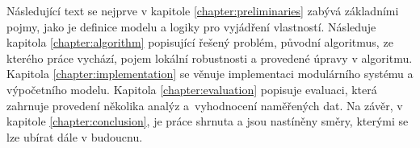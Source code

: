 Následující text se nejprve v kapitole \ref{chapter:preliminaries} zabývá základními pojmy, jako je definice modelu a logiky
pro vyjádření vlastností. Následuje kapitola \ref{chapter:algorithm} popisující řešený problém, původní
algoritmus, ze kterého práce vychází, pojem lokální robustnosti a provedené úpravy v algoritmu.
Kapitola \ref{chapter:implementation} se věnuje implementaci modulárního systému a výpočetního modelu.
Kapitola \ref{chapter:evaluation} popisuje evaluaci, která zahrnuje provedení několika analýz
a~vy\-hod\-no\-ce\-ní naměřených dat. Na závěr, v kapitole \ref{chapter:conclusion}, je práce
shrnuta a jsou nastíněny směry, kterými se lze ubírat dále v budoucnu.

